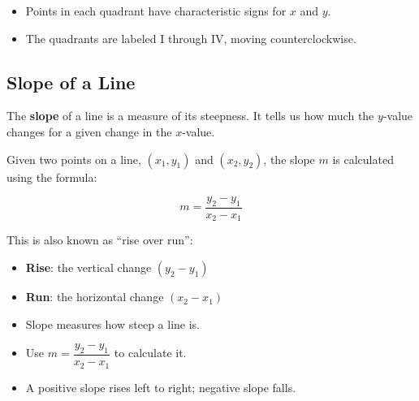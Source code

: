 \documentclass[11pt]{article}
\begin{document}
\begin{tcolorbox}[colback=green!5!white, colframe=green!50!black, title=Summary of Quadrants]
\begin{itemize}
  \item Points in each quadrant have characteristic signs for \(x\) and \(y\).
  \item The quadrants are labeled I through IV, moving counterclockwise.
\end{itemize}
\end{tcolorbox}
\subsection{Slope of a Line}

The \textbf{slope} of a line is a measure of its steepness. It tells us how much the \( y \)-value changes for a given change in the \( x \)-value.

Given two points on a line, \( (x_1, y_1) \) and \( (x_2, y_2) \), the slope \( m \) is calculated using the formula:

\[
m = \frac{y_2 - y_1}{x_2 - x_1}
\]

This is also known as “rise over run”:
\begin{itemize}
  \item \textbf{Rise}: the vertical change \( (y_2 - y_1) \)
  \item \textbf{Run}: the horizontal change \( (x_2 - x_1) \)
\end{itemize}

\begin{center}
\end{center}

\begin{tcolorbox}[colback=yellow!5!white, colframe=yellow!80!black, title=Summary: Slope of a Line]
\begin{itemize}
  \item Slope measures how steep a line is.
  \item Use \( m = \dfrac{y_2 - y_1}{x_2 - x_1} \) to calculate it.
  \item A positive slope rises left to right; negative slope falls.
\end{itemize}
\end{tcolorbox}
\end{document}

